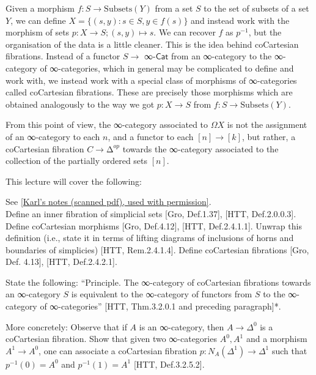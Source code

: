\documentclass[a4paper]{amsart}
\numberwithin{figure}{section}
\theoremstyle{theorem}
\theoremstyle{definition}
\begin{document}
Given a morphism $f: S \to \mathrm{Subsets}(Y)$ from a set $S$ to the set of subsets of a set $Y$, we can define $X = \{(s, y) : s \in S, y \in f(s)\}$ and instead work with the morphism of sets $p: X \to S; (s, y) \mapsto s$. We can recover $f$ as $p^{-1}$, but the organisation of the data is a little cleaner. This is the idea behind coCartesian fibrations. Instead of a functor $S \to $ ∞-$\mathsf{Cat}$ from an ∞-category to the ∞-category of ∞-categories, which in general may be complicated to define and work with, we instead work with a special class of morphisms of ∞-categories called coCartesian fibrations. These are precisely those morphisms which are obtained analogously to the way we got $p: X → S$ from $f: S → \mathrm{Subsets}(Y)$.

From this point of view, the ∞-category associated to $\Omega X$ is not the assignment of an ∞-category to each $n$, and a functor to each $[n] → [k]$, but rather, a coCartesian fibration $C → ∆^{op}$ towards the ∞-category associated to the collection of the partially ordered sets $[n]$.



This lecture will cover the following:

See \href{InfCat6MIC.pdf}{[Karl's notes (scanned pdf), used with permission]}. \\%

Define an inner fibration of simplicial sets [Gro, Def.1.37], [HTT, Def.2.0.0.3]. %
Define coCartesian morphisms [Gro, Def.4.12], [HTT, Def.2.4.1.1]. %
Unwrap this definition (i.e., state it in terms of lifting diagrams of inclusions of horns and boundaries of simplicies) [HTT, Rem.2.4.1.4]. %
Define coCartesian fibrations [Gro, Def. 4.13], [HTT, Def.2.4.2.1]. %

State the following: ``Principle. The ∞-category of coCartesian fibrations towards an ∞-category $S$ is equivalent to the ∞-category of functors from $S$ to the ∞-category of ∞-categories'' [HTT, Thm.3.2.0.1 and preceding paragraph]*. %

More concretely: %
Observe that if $A$ is an ∞-category, then $A {\to} \Delta^0$ is a coCartesian fibration. %
Show that given two ∞-categories $A^{0}, A^{1}$ and a morphism $A^{1} \to A^{0}$, one can associate a coCartesian fibration $p: N_A(\Delta^1) \to \Delta^1$ such that $p^{-1}(0) = A^0$ and $p^{-1}(1) = A^1$ [HTT, Def.3.2.5.2]. %
\end{document}
